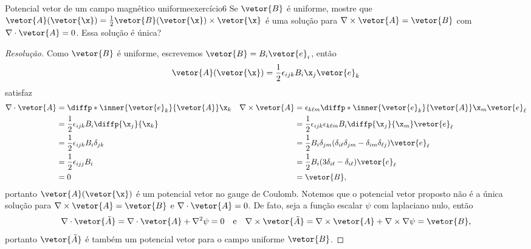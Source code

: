\begin{exercício}{Potencial vetor de um campo magnético uniforme}{exercício6}
    Se \(\vetor{B}\) é uniforme, mostre que \(\vetor{A}(\vetor{\x}) = \frac12\vetor{B}(\vetor{\x})\times \vetor{\x}\) é uma solução para \(\nabla \times \vetor{A} = \vetor{B}\) com \(\nabla \cdot \vetor{A} = 0\). Essa solução é única?
\end{exercício}
\begin{proof}[Resolução]
    Como \(\vetor{B}\) é uniforme, escrevemos \(\vetor{B} = B_i \vetor{e}_i\), então
    \begin{equation*}
        \vetor{A}(\vetor{\x}) = \frac12 \epsilon_{ijk} B_i \x_j \vetor{e}_k
    \end{equation*}
    satisfaz
    \begin{align*}
        \nabla \cdot \vetor{A} &= \diffp*{\inner{\vetor{e}_k}{\vetor{A}}}{\x_k} &
        \nabla \times \vetor{A} &= \epsilon_{k\ell m} \diffp*{\inner{\vetor{e}_k}{\vetor{A}}}{\x_m}\vetor{e}_\ell \\
                               &= \frac12 \epsilon_{ijk} B_i\diffp{\x_j}{\x_k} &
                               &= \frac12 \epsilon_{ijk} \epsilon_{k\ell m} B_i \diffp{\x_j}{\x_m} \vetor{e}_\ell \\
                               &= \frac12 \epsilon_{ijk} B_i \delta_{jk} &
                               &= \frac12 B_i \delta_{jm} (\delta_{i \ell} \delta_{jm} - \delta_{im} \delta_{\ell j}) \vetor{e}_\ell \\
                               &= \frac12 \epsilon_{ijj} B_i &
                               &= \frac12 B_i (3 \delta_{i \ell} - \delta_{i\ell}) \vetor{e}_\ell \\
                               &= 0&
                               &= \vetor{B},
    \end{align*}
    portanto \(\vetor{A}(\vetor{\x})\) é um potencial vetor no gauge de Coulomb. Notemos que o potencial vetor proposto não é a única solução para \(\nabla \times \vetor{A} = \vetor{B}\) e \(\nabla \cdot \vetor{A} = 0\). De fato, seja a função escalar \(\psi\) com laplaciano nulo, então
    \begin{equation*}
        \nabla \cdot \vetor{\tilde{A}} = \nabla \cdot \vetor{A} + \nabla^2 \psi = 0
        \quad\text{e}\quad
        \nabla \times \vetor{\tilde{A}} = \nabla \times \vetor{A} + \nabla \times \nabla\psi = \vetor{B},
    \end{equation*}
    portanto \(\vetor{\tilde{A}}\) é também um potencial vetor para o campo uniforme \(\vetor{B}\).
\end{proof}
